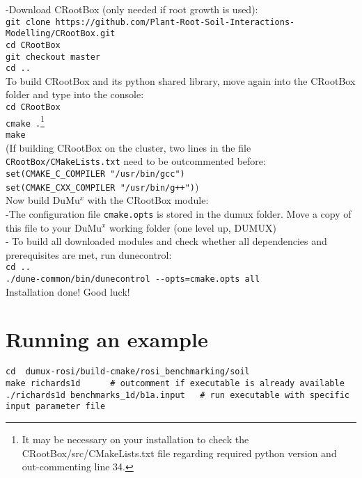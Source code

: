 -Download CRootBox (only needed if root growth is used):\\
\texttt{git clone https://github.com/Plant-Root-Soil-Interactions-Modelling/CRootBox.git}\\
    \hspace{\parindent} \texttt{cd CRootBox}\\
    \hspace{\parindent} \texttt{git checkout master}\\
		\hspace{\parindent} \texttt{cd ..}\\
To build CRootBox and its python shared library, move again into the CRootBox folder and type into the console:\\
\lstinline {cd CRootBox}\\
\lstinline{cmake .}\footnote{It may be necessary on your installation to check the CRootBox/src/CMakeLists.txt file regarding required python version and out-commenting line 34.}\\
\lstinline{make}\\
(If building CRootBox on the cluster, two lines in the file \lstinline{CRootBox/CMakeLists.txt} need to be outcommented before:\\ 
\lstinline{set(CMAKE_C_COMPILER "/usr/bin/gcc")}\\
\lstinline{set(CMAKE_CXX_COMPILER "/usr/bin/g++")})\\

Now build DuMu$^{x}$ with the CRootBox module: \\
-The configuration file \lstinline{cmake.opts} is stored in the dumux folder. Move a copy of this file to your DuMu$^x$ working folder (one level up, DUMUX)\\

- To build all downloaded modules and check whether all dependencies and prerequisites are met, run dunecontrol:\\
\lstinline{cd ..} \\
\lstinline{./dune-common/bin/dunecontrol --opts=cmake.opts all}\\

Installation done! Good luck!

\section*{Running an example}

\begin{lstlisting}
cd  dumux-rosi/build-cmake/rosi_benchmarking/soil
make richards1d      # outcomment if executable is already available
./richards1d benchmarks_1d/b1a.input   # run executable with specific input parameter file
\end{lstlisting}


